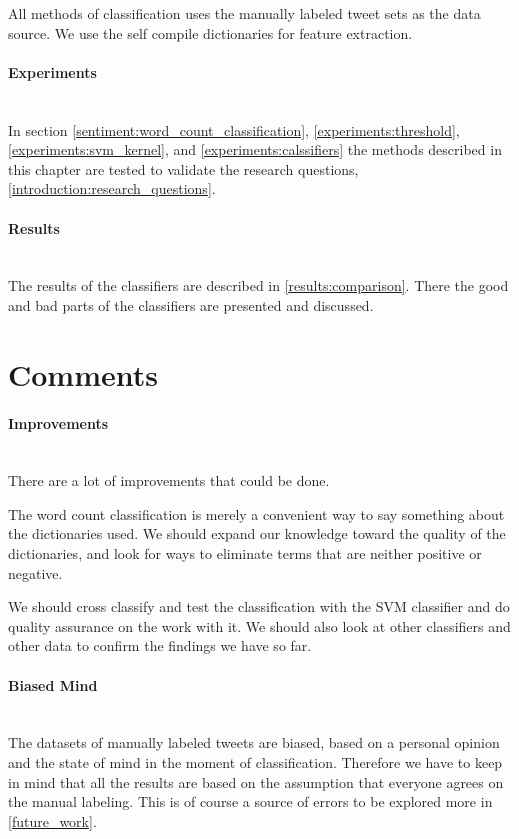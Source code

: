 All methods of classification uses the manually labeled tweet sets as the data
source. We use the self compile dictionaries for feature extraction.

\paragraph{Experiments}
\hspace{0pt}\\
In section \ref{sentiment:word_count_classification},
\ref{experiments:threshold}, \ref{experiments:svm_kernel}, and
\ref{experiments:calssifiers} the methods described in this chapter are tested
to validate the research questions, \ref{introduction:research_questions}.

\paragraph{Results}
\hspace{0pt}\\
The results of the classifiers are described in \ref{results:comparison}. There
the good and bad parts of the classifiers are presented and discussed. 
%

\section{Comments}\label{sentiment:comments_discussion}
\paragraph{Improvements}
\hspace{0pt}\\
There are a lot of improvements that could be done. 

The word count classification is merely a convenient way to say something about
the dictionaries used. We should expand our knowledge toward the quality of the
dictionaries, and look for ways to eliminate terms that are neither positive or
negative. 

We should cross classify and test the classification with the SVM classifier and
do quality assurance on the work with it. We should also look at other
classifiers and other data to confirm the findings we have so far. 

\paragraph{Biased Mind}
\hspace{0pt}\\
The datasets of manually labeled tweets are biased, based on a personal opinion
and the state of mind in the moment of classification. Therefore we have to keep
in mind that all the results are based on the assumption that everyone agrees on
the manual labeling. This is of course a source of errors to be
explored more in \ref{future_work}. 

